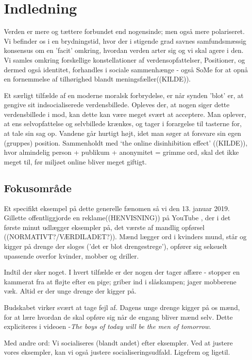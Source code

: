 \section{Indledning} 

Verden er mere og tættere forbundet end nogensinde; men også mere
polariseret.  Vi befinder os i en brydningstid, hvor der i
stigende grad savnes samfundsmæssig konsensus om en 'facit'
omkring, hvordan verden arter sig og vi skal agere i den. Vi
samles omkring forskellige konstellationer af verdensopfattelser,
Positioner, og dermed også identitet, forhandles i sociale
sammenhænge - også SoMe
for at opnå en fornemmelse af tilhørighed blandt
meningsfæller((KILDE)). 

Et særligt tilfælde af en moderne moralsk forbrydelse, er når
synden 'blot' er, at gengive sit indsocialiserede verdensbillede.
Opleves der, at nogen siger dette verdensbillede i mod, kan dette
kan være meget svært at acceptere. Man oplever, at ens
selvopfattelse og selvbillede krænkes, og tager i forargelse til
tasterne for, at tale sin sag op. Vandene går hurtigt højt, idet
man søger at forsvare sin egen (gruppes) position. Sammenholdt med
‘the online disinhibition effect' ((KILDE)), hvor almindelig
person + publikum + anonymitet = grimme ord, skal det ikke meget
til, før miljøet online bliver meget giftigt.

\subsection{Fokusområde}

Et specifikt eksempel på dette generelle fænomen så vi den 13.
januar 2019.  Gillette offentliggjorde en reklame((HENVISNING)) på
YouTube , der i det første minut udlægger eksempler på, det værste
af mandlig opførsel ((NORMATIVT?/VÆRDILADET?)).  Mænd lægger ord i
kvinders mund, står og kigger på drenge der sloges ('det er blot
drengestrege'), opfører sig seksuelt upassende overfor kvinder,
mobber og driller.

Indtil der sker noget. I hvert tilfælde er der nogen der tager
affære - stopper en kammerat fra at fløjte efter en pige; griber
ind i slåskampen; jager mobberene væk.  Altid er der unge drenge
der kigger på.

Budskabet virker svært at tage fejl af. Dagens unge drenge kigger
på os mænd, for at lære hvordan de skal opføre sig når de engang
bliver mænd selv.  Dette expliciteres i videoen -\textit{The boys
of today will be the men of tomorrow}.

Med andre ord: Vi socialiseres (blandt andet) efter eksempler. Ved
at justere vores eksempler, kan vi også justere
socialiseringsudfald. Ligefrem og ligetil.


